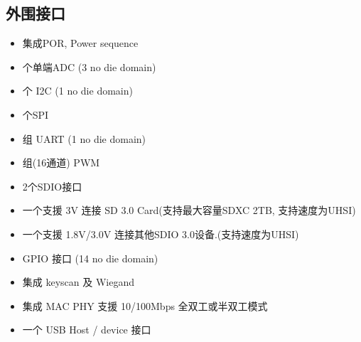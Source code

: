 \documentclass[letterpaper,10pt,english]{sphinxmanual}
\begin{document}
\subsection{外围接口}
\label{\detokenize{contents/system-overview/features:id10}}\begin{itemize}
\item {} 
\sphinxAtStartPar
集成POR, Power sequence

\item {} 
 个单端ADC (3 no die domain)

\item {} 
 个 I2C (1 no die domain)

\item {} 
 个SPI

\item {} 
 组 UART (1 no die domain)

\item {} 
 组(16通道) PWM

\item {} 
\sphinxAtStartPar
2个SDIO接口

\item {} 
\sphinxAtStartPar
一个支援 3V 连接 SD 3.0 Card(支持最大容量SDXC 2TB, 支持速度为UHS\sphinxhyphen{}I)

\item {} 
\sphinxAtStartPar
一个支援 1.8V/3.0V 连接其他SDIO 3.0设备.(支持速度为UHS\sphinxhyphen{}I)

\item {} 
 GPIO 接口 (14 no die domain)

\item {} 
\sphinxAtStartPar
集成 keyscan 及 Wiegand

\item {} 
\sphinxAtStartPar
集成 MAC PHY 支援 10/100Mbps 全双工或半双工模式

\item {} 
\sphinxAtStartPar
一个 USB Host / device 接口

\end{itemize}
\end{document}

